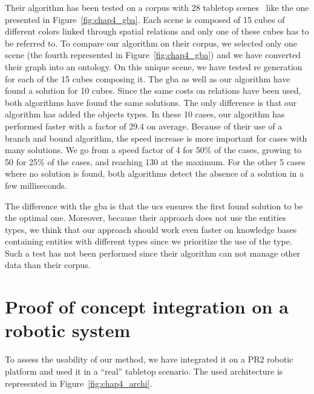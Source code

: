 Their algorithm has been tested on a corpus with 28 tabletop scenes~\cite{li_2016_spatial} like the one presented in Figure~\ref{fig:chap4_gba}. Each scene is composed of 15 cubes of different colors linked through spatial relations and only one of these cubes has to be referred to. To compare our algorithm on their corpus, we selected only one scene (the fourth represented in Figure~\ref{fig:chap4_gba}) and we have converted their graph into an ontology. On this unique scene, we have tested \acrshort{re} generation for each of the 15 cubes composing it. The \acrshort{gba} as well as our algorithm have found a solution for 10 cubes. Since the same costs on relations have been used, both algorithms have found the same solutions. The only difference is that our algorithm has added the objects types. In these 10 cases, our algorithm has performed faster with a factor of 29.4 on average. Because of their use of a branch and bound algorithm, the speed increase is more important for cases with many solutions. We go from a speed factor of 4 for 50\% of the cases, growing to 50 for 25\% of the cases, and reaching 130 at the maximum. For the other 5 cases where no solution is found, both algorithms detect the absence of a solution in a few milliseconds.

The difference with the \acrshort{gba} is that the \acrlong{ucs} ensures the first found solution to be the optimal one. Moreover, because their approach does not use the entities types, we think that our approach should work even faster on knowledge bases containing entities with different types since we prioritize the use of the type. Such a test has not been performed since their algorithm can not manage other data than their corpus.

\section[Integration on a robotic system]{Proof of concept integration on a robotic system}

To assess the usability of our method, we have integrated it on a PR2 robotic platform and used it in a ``real'' tabletop scenario. The used architecture is represented in Figure~\ref{fig:chap4_archi}.

